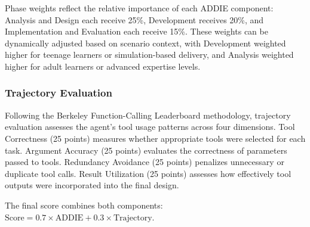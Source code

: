 Phase weights reflect the relative importance of each ADDIE component: Analysis and Design each receive 25\%, Development receives 20\%, and Implementation and Evaluation each receive 15\%. These weights can be dynamically adjusted based on scenario context, with Development weighted higher for teenage learners or simulation-based delivery, and Analysis weighted higher for adult learners or advanced expertise levels.

\subsubsection{Trajectory Evaluation}
Following the Berkeley Function-Calling Leaderboard methodology, trajectory evaluation assesses the agent's tool usage patterns across four dimensions. Tool Correctness (25 points) measures whether appropriate tools were selected for each task. Argument Accuracy (25 points) evaluates the correctness of parameters passed to tools. Redundancy Avoidance (25 points) penalizes unnecessary or duplicate tool calls. Result Utilization (25 points) assesses how effectively tool outputs were incorporated into the final design.

The final score combines both components: $\text{Score} = 0.7 \times \text{ADDIE} + 0.3 \times \text{Trajectory}$.

